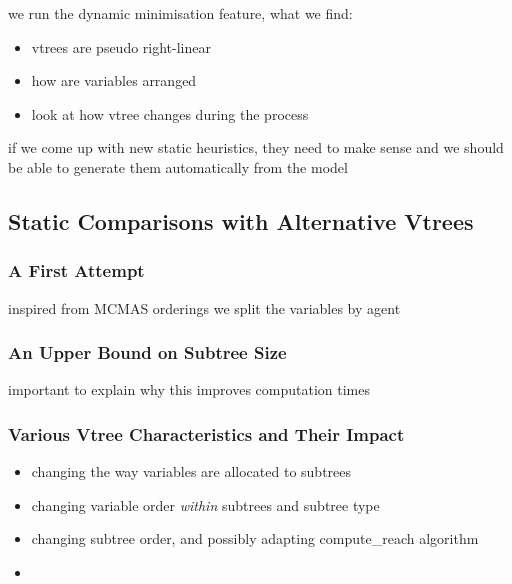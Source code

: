 \documentclass[11pt]{article}
\begin{document}
we run the dynamic minimisation feature, what we find: 
\begin{itemize}
\item vtrees are pseudo right-linear
\item how are variables arranged
\item look at how vtree changes during the process
\end{itemize}
if we come up with new static heuristics, they need to make sense and we should be able to generate them automatically from the model 


\subsection{Static Comparisons with Alternative Vtrees}

\subsubsection{A First Attempt}

inspired from MCMAS orderings we split the variables by agent

\subsubsection{An Upper Bound on Subtree Size}

important to explain why this improves computation times
\subsubsection{Various Vtree Characteristics and Their Impact}

\begin{itemize}
\item changing the way variables are allocated to subtrees
\item changing variable order \textit{within} subtrees and subtree type
\item changing subtree order, and possibly adapting compute\_reach algorithm
\item 

\end{itemize}
\end{document}
